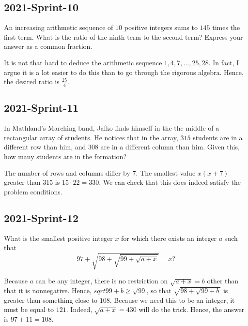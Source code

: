 \documentclass[12pt]{article}
\begin{document}
\subsection*{2021-Sprint-10}
An increasing arithmetic sequence of $10$ positive integers sums to $145$ times the first term. What is the ratio of the ninth term to the second term? Express your answer as a common fraction.
\begin{answer}
It is not that hard to deduce the arithmetic sequence $1, 4, 7, ..., 25, 28$. In fact, I argue it is a lot easier to do this than to go through the rigorous algebra. Hence, the desired ratio is $\boxed{\frac{25}{4}}$.
\end{answer}

\subsection*{2021-Sprint-11}
In Mathland's Marching band, Jafko finds himself in the the middle of a rectangular array of students. He notices that in the array, $315$ students are in a different row than him, and $308$ are in a different column than him. Given this, how many students are in the formation?
\begin{answer}
The number of rows and columns differ by $7$. The smallest value $x(x+7)$ greater than $315$ is $15\cdot 22 = \boxed{330}$. We can check that this does indeed satisfy the problem conditions.
\end{answer}

\subsection*{2021-Sprint-12}
What is the smallest positive integer $x$ for which there exists an integer $a$ such that $$97+\sqrt{98+\sqrt{99+\sqrt{a+x}}}=x?$$
\begin{answer}
Because $a$ can be any integer, there is no restriction on $\sqrt{a+x} = b$ other than that it is nonnegative. Hence, $sqrt{99+b} \ge \sqrt{99}$, so that $\sqrt{98+\sqrt{99+b}}$ is greater than something close to $108$. Because we need this to be an integer, it must be equal to $121$. Indeed, $\sqrt{a+x} = 430$ will do the trick. Hence, the answer is $97+11=\boxed{108}$.
\end{answer}
\end{document}
